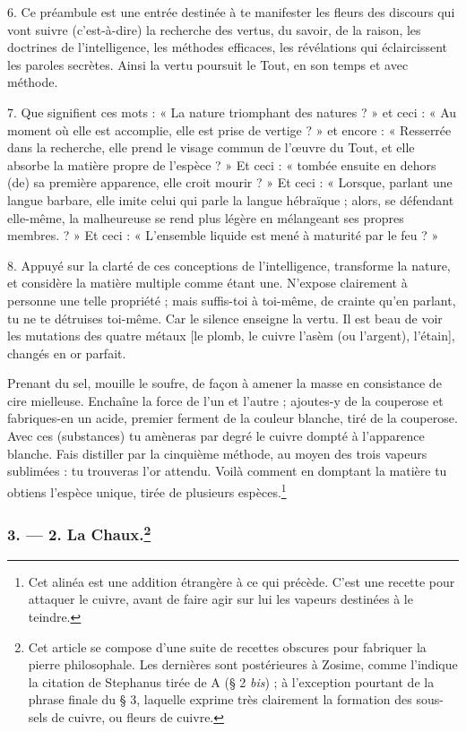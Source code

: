 \documentclass[landscape, a4paper, 11pt, oneside, polutonikogreek, french]{article}
\begin{document}
6. Ce préambule est une entrée destinée à te manifester les fleurs des discours qui vont suivre (c'est-à-dire) la recherche des vertus, du savoir, de la raison, les doctrines de l'intelligence, les méthodes efficaces, les révélations qui éclaircissent les paroles secrètes. Ainsi la vertu poursuit le Tout, en son temps et avec méthode.

7. Que signifient ces mots : « La nature triomphant des natures ? » et ceci : « Au moment où elle est accomplie, elle est prise de vertige ? » et encore : « Resserrée dans la recherche, elle prend le visage commun de l'œuvre du Tout, et elle absorbe la matière propre de l'espèce ? » Et ceci : « tombée ensuite en dehors (de) sa première apparence, elle croit mourir ? » Et ceci : « Lorsque, parlant une langue barbare, elle imite celui qui parle la langue hébraïque ; alors, se défendant elle-même, la malheureuse se rend plus légère en mélangeant ses propres membres. ? » Et ceci : « L'ensemble liquide est mené à maturité par le feu ? »

8. Appuyé sur la clarté de ces conceptions de l'intelligence, transforme la nature, et considère la matière multiple comme étant une. N'expose clairement à personne une telle propriété ; mais suffis-toi à toi-même, de crainte qu'en parlant, tu ne te détruises toi-même. Car le silence enseigne la vertu. Il est beau de voir les mutations des quatre métaux [le plomb, le cuivre l'asèm (ou l'argent), l'étain], changés en or parfait.

Prenant du sel, mouille le soufre, de façon à amener la masse en consistance de cire mielleuse. Enchaîne la force de l'un et l'autre ; ajoutes-y de la couperose et fabriques-en un acide, premier ferment de la couleur blanche, tiré de la couperose. Avec ces (substances) tu amèneras par degré le cuivre dompté à l'apparence blanche. Fais distiller par la cinquième méthode, au moyen des trois vapeurs sublimées : tu trouveras l'or attendu. Voilà comment en domptant la matière tu obtiens l'espèce unique, tirée de plusieurs espèces.\footnote{Cet alinéa est une addition étrangère à ce qui précède. C'est une recette pour attaquer le cuivre, avant de faire agir sur lui les vapeurs destinées à le teindre.}

\bigskip
\centerline{\EightStarTaper}
\centerline{\EightStarTaper\EightStarTaper}
\bigskip

\subsubsection[3. --- 2. La Chaux.]{3. --- 2. La Chaux.\footnote{Cet article se compose d'une suite de recettes obscures pour fabriquer la pierre philosophale. Les dernières sont postérieures à Zosime, comme l'indique la citation de Stephanus tirée de A (§ 2 \emph{bis}) ; à l'exception pourtant de la phrase finale du § 3, laquelle exprime très clairement la formation des sous-sels de cuivre, ou fleurs de cuivre.}}
\end{document}
